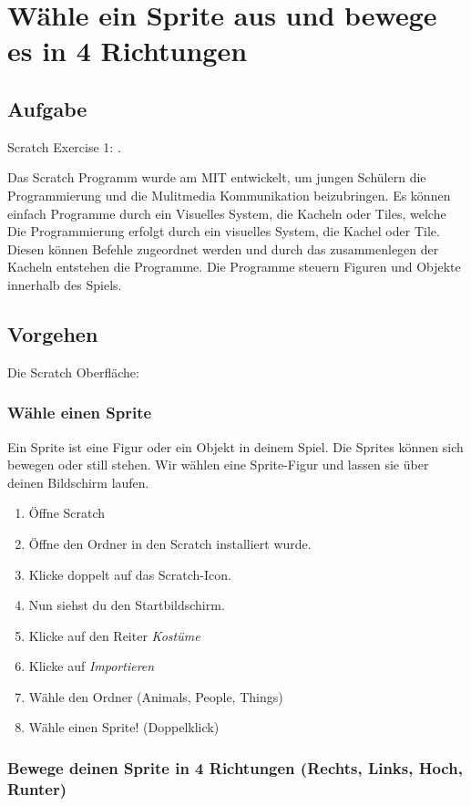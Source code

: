 \section{Wähle ein Sprite aus und bewege es in 4 Richtungen}
\subsection{Aufgabe}
Scratch Exercise 1: .

Das Scratch Programm wurde am MIT entwickelt, um jungen Schülern die Programmierung und die Mulitmedia Kommunikation beizubringen. 
Es können einfach Programme durch ein Visuelles System, die Kacheln oder Tiles, welche 
Die Programmierung erfolgt durch ein visuelles System, die Kachel oder Tile. Diesen können Befehle zugeordnet werden und durch das zusammenlegen der Kacheln entstehen die Programme. Die Programme steuern Figuren und Objekte innerhalb des Spiels.


\subsection{Vorgehen}
Die Scratch Oberfläche:


\subsubsection{Wähle einen Sprite}

Ein Sprite ist eine Figur oder ein Objekt in deinem Spiel. Die Sprites können sich bewegen oder still stehen. Wir wählen eine Sprite-Figur und lassen sie über deinen Bildschirm laufen.
\begin{enumerate}
\item Öffne Scratch
\item Öffne den Ordner in den Scratch installiert wurde.
\item Klicke doppelt auf das Scratch-Icon.
\item Nun siehst du den Startbildschirm. 
\item Klicke auf den Reiter \textit{Kostüme}
\item Klicke auf \textit{Importieren}
\item Wähle den Ordner (Animals, People, Things)
\item Wähle einen  Sprite! (Doppelklick)
\end{enumerate}

\subsubsection{Bewege deinen Sprite in 4 Richtungen (Rechts, Links, Hoch, Runter)}

